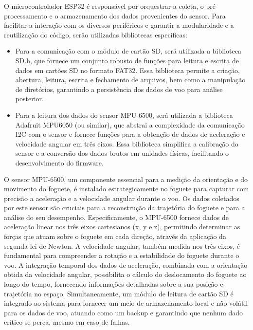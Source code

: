 O microcontrolador ESP32 é responsável por orquestrar a coleta, o pré-processamento e o armazenamento dos dados provenientes do sensor. Para facilitar a interação com os diversos periféricos e garantir a modularidade e a reutilização do código, serão utilizadas bibliotecas específicas:

\begin{itemize}
    \item   Para a comunicação com o módulo de cartão SD, será utilizada a biblioteca SD.h, que fornece um conjunto robusto de funções para leitura e escrita de dados em cartões SD no formato FAT32. Essa biblioteca permite a criação, abertura, leitura, escrita e fechamento de arquivos, bem como a manipulação de diretórios, garantindo a persistência dos dados de voo para análise posterior.
    \item   Para a leitura dos dados do sensor MPU-6500, será utilizada a biblioteca Adafruit MPU6050 (ou similar), que abstrai a complexidade da comunicação I2C com o sensor e fornece funções para a obtenção de dados de aceleração e velocidade angular em três eixos. Essa biblioteca simplifica a calibração do sensor e a conversão dos dados brutos em unidades físicas, facilitando o desenvolvimento do firmware.
\end{itemize}

O sensor MPU-6500, um componente essencial para a medição da orientação e do movimento do foguete, é instalado estrategicamente no foguete para capturar com precisão a aceleração e a velocidade angular durante o voo. Os dados coletados por este sensor são cruciais para a reconstrução da trajetória do foguete e para a análise do seu desempenho. Especificamente, o MPU-6500 fornece dados de aceleração linear nos três eixos cartesianos (x, y e z), permitindo determinar as forças que atuam sobre o foguete em cada direção, através da aplicação da segunda lei de Newton. A velocidade angular, também medida nos três eixos, é fundamental para compreender a rotação e a estabilidade do foguete durante o voo. A integração temporal dos dados de aceleração, combinada com a orientação obtida da velocidade angular, possibilita o cálculo do deslocamento do foguete ao longo do tempo, fornecendo informações detalhadas sobre a sua posição e trajetória no espaço. Simultaneamente, um módulo de leitura de cartão SD é integrado ao sistema para fornecer um meio de armazenamento local e não volátil para os dados de voo, atuando como um backup e garantindo que nenhum dado crítico se perca, mesmo em caso de falhas.

